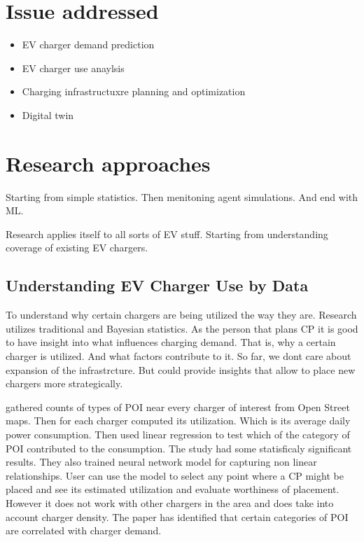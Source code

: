 \section{Issue addressed}

\begin{itemize}
    \item EV charger demand prediction
    \item EV charger use anaylsis
    \item Charging infrastructuxre planning and optimization
    \item Digital twin
\end{itemize}

\section{Research approaches}

Starting from simple statistics. Then menitoning agent simulations. And end with ML.

Research applies itself to all sorts of EV stuff. Starting from understanding coverage of existing EV chargers.

\subsection{Understanding EV Charger Use by Data}


To understand why certain chargers are being utilized the way they are. Research utilizes traditional and Bayesian statistics. As the person that plans \acrfull{CP} it is good to have insight into what influences charging demand. That is, why a certain charger is utilized. And what factors contribute to it. So far, we dont care about expansion of the infrastrcture. But could provide insights that allow to place new chargers more strategically.

 gathered counts of types of \acrfull{POI} near every charger of interest  from Open Street maps. Then for each charger computed its utilization. Which is its average daily power consumption. Then used linear regression to test which of the category of \acrfull{POI} contributed to the consumption.
The study had some statisficaly significant results. They also trained neural network model for capturing non linear relationships. User can use the model to select any point where a \acrfull{CP} might be placed and see its estimated utilization and evaluate worthiness of placement. However it does not work with other chargers in the area and does take into account charger density. The paper has identified that certain categories of \acrfull{POI} are correlated with charger demand.

